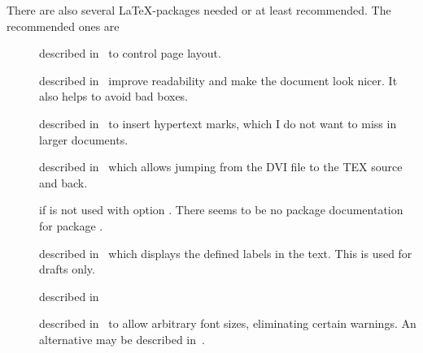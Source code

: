 There are also several \LaTeX-packages needed or at least recommended. 
The recommended ones are 
%
\begin{description}
\item[] described in~\cite{GeomP} 
to control page layout. 
\item[] described in~\cite{MicroTyP} improve readability 
and make the document look nicer. 
It also helps to avoid bad boxes. 
\item[] described in~\cite{HyperTextP} 
to insert hypertext marks, which I do not want to miss in larger documents. 
\item[] described in~\cite{SrcLtxP} 
which allows jumping from the DVI file to the TEX source and back.
\item[] 
if  is not used with option . 
There seems to be no package documentation for package . 
\item[] described in~\cite{ShowLabelsP} 
which displays the defined labels in the text. 
This is used for drafts only. 
\item[] described in~\cite{BooktP} 

\item[] described in~\cite{AnyfontsizeP} 
to allow arbitrary font sizes, eliminating certain warnings. 
An alternative may be  described in~\cite{FixCmP}. 
\end{description}

